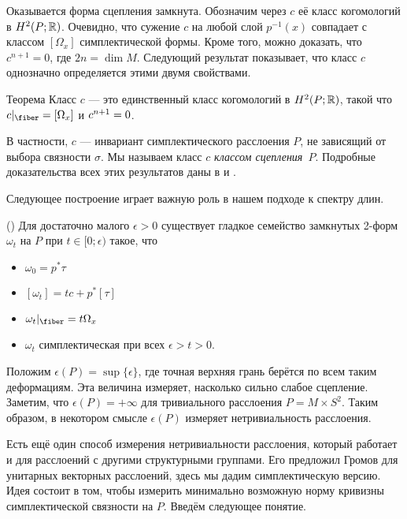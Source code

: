 Оказывается форма сцепления замкнута.
Обозначим через $c$ её класс когомологий в $H^2 (P;\mathbb{R})$.
Очевидно, что сужение $c$ на любой слой $p^{-1}(x)$ совпадает с классом $[\Omega_x]$
симплектической формы.  
Кроме того, можно доказать, что $c^{n+1} = 0$, где $2n = \dim M$.
Следующий результат показывает, что класс $c$ однозначно определяется
этими двумя свойствами. 

\begin{thm}{Теорема}\label{9.3.A}
  Класс $c$ — это единственный класс когомологий в $H^2 (P;\mathbb{R})$,
  такой что $c|_{\fiber} = [\Omega_x]$ и $c^{n+1} \z= 0$.
\end{thm}

В частности, $c$ — инвариант симплектического расслоения $P$, не
зависящий от выбора связности $\sigma$. 
Мы называем класс $c$ \emph{классом сцепления}~$P$.
Подробные доказательства всех этих результатов даны в \cite{GLS} и \cite{MS}.

Следующее построение играет важную роль в нашем подходе к спектру длин.

(\cite{GLS,MS})
Для достаточно малого $\epsilon > 0$ существует гладкое семейство
замкнутых 2-форм $\omega_t$ на $P$ при $t \in [0;\epsilon)$ такое, что 
\begin{itemize}
\item $\omega_0 = p^\ast \tau$
\item $[\omega_t] = tc + p^\ast [\tau]$
\item $\omega_t|_{\fiber} = t\Omega_x$
\item $\omega_t$ симплектическая при всех $\epsilon > t > 0$.
\end{itemize}

Положим $\epsilon(P) = \sup \{\epsilon\}$,
где точная верхняя грань берётся по всем таким деформациям.  
Эта величина измеряет, насколько сильно слабое сцепление.
Заметим, что $\epsilon(P) = +\infty$ для тривиального расслоения $P = M \times S^2$.
Таким образом, в некотором смысле $\epsilon(P)$ измеряет нетривиальность расслоения.

Есть ещё один способ измерения нетривиальности расслоения, который
работает и для расслоений с другими структурными группами. 
Его предложил Громов \cite{G2} для унитарных
векторных расслоений, здесь мы дадим симплектическую версию. 
Идея состоит в том, чтобы измерить минимально возможную норму кривизны
симплектической связности на $P$. 
Введём следующее понятие.

